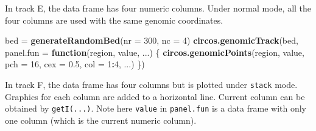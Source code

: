 \documentclass[]{book}
\newenvironment{Shaded}{\begin{snugshade}}{\end{snugshade}}
\newcommand{\KeywordTok}[1]{\textcolor[rgb]{0.13,0.29,0.53}{\textbf{#1}}}
\newcommand{\DataTypeTok}[1]{\textcolor[rgb]{0.13,0.29,0.53}{#1}}
\newcommand{\DecValTok}[1]{\textcolor[rgb]{0.00,0.00,0.81}{#1}}
\newcommand{\FloatTok}[1]{\textcolor[rgb]{0.00,0.00,0.81}{#1}}
\newcommand{\StringTok}[1]{\textcolor[rgb]{0.31,0.60,0.02}{#1}}
\newcommand{\OtherTok}[1]{\textcolor[rgb]{0.56,0.35,0.01}{#1}}
\newcommand{\ControlFlowTok}[1]{\textcolor[rgb]{0.13,0.29,0.53}{\textbf{#1}}}
\newcommand{\OperatorTok}[1]{\textcolor[rgb]{0.81,0.36,0.00}{\textbf{#1}}}
\newcommand{\NormalTok}[1]{#1}
\theoremstyle{definition}
\theoremstyle{definition}
\theoremstyle{remark}
\begin{document}
\begin{Shaded}
\end{Shaded}

In track E, the data frame has four numeric columns. Under normal mode,
all the four columns are used with the same genomic coordinates.

\begin{Shaded}
\begin{Highlighting}[]
\NormalTok{bed =}\StringTok{ }\KeywordTok{generateRandomBed}\NormalTok{(}\DataTypeTok{nr =} \DecValTok{300}\NormalTok{, }\DataTypeTok{nc =} \DecValTok{4}\NormalTok{)}
\KeywordTok{circos.genomicTrack}\NormalTok{(bed, }
    \DataTypeTok{panel.fun =} \ControlFlowTok{function}\NormalTok{(region, value, ...) \{}
        \KeywordTok{circos.genomicPoints}\NormalTok{(region, value, }\DataTypeTok{pch =} \DecValTok{16}\NormalTok{, }\DataTypeTok{cex =} \FloatTok{0.5}\NormalTok{, }\DataTypeTok{col =} \DecValTok{1}\OperatorTok{:}\DecValTok{4}\NormalTok{, ...)}
\NormalTok{\})}
\end{Highlighting}
\end{Shaded}

In track F, the data frame has four columns but is plotted under
\texttt{stack} mode. Graphics for each column are added to a horizontal
line. Current column can be obtained by \texttt{getI(...)}. Note here
\texttt{value} in \texttt{panel.fun} is a data frame with only one
column (which is the current numeric column).
\end{document}
